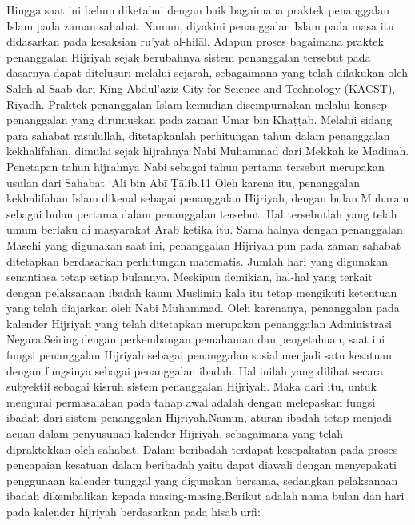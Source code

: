     Hingga saat ini belum diketahui dengan baik bagaimana praktek penanggalan Islam pada zaman sahabat. Namun, diyakini penanggalan Islam pada masa itu didasarkan pada kesaksian ru’yat al-hilāl. Adapun proses bagaimana praktek penanggalan Hijriyah sejak berubahnya sistem penanggalan tersebut pada dasarnya dapat ditelusuri melalui sejarah, sebagaimana yang telah dilakukan oleh Saleh al-Saab dari King Abdul’aziz City for Science and Technology (KACST), Riyadh.
    Praktek penanggalan Islam kemudian disempurnakan melalui konsep penanggalan yang dirumuskan pada zaman Umar bin Khaṭṭab. Melalui sidang para sahabat rasulullah, ditetapkanlah perhitungan tahun dalam penanggalan kekhalifahan, dimulai sejak hijrahnya Nabi Muhammad dari Mekkah ke Madinah.
    Penetapan tahun hijrahnya Nabi sebagai tahun pertama tersebut merupakan usulan dari Sahabat ‘Ali bin Abī Ṭālib.11 Oleh karena itu, penanggalan kekhalifahan Islam dikenal sebagai penanggalan Hijriyah, dengan bulan Muharam sebagai bulan pertama dalam penanggalan tersebut. Hal tersebutlah yang telah umum berlaku di masyarakat Arab ketika itu.
    Sama halnya dengan penanggalan Masehi yang digunakan saat ini, penanggalan Hijriyah pun pada zaman sahabat ditetapkan berdasarkan perhitungan matematis. Jumlah hari yang digunakan senantiasa tetap setiap bulannya. Meskipun demikian, hal-hal yang terkait dengan pelaksanaan ibadah kaum Muslimin kala itu tetap mengikuti ketentuan yang telah diajarkan oleh Nabi Muhammad.
    Oleh karenanya, penanggalan pada kalender Hijriyah yang telah ditetapkan merupakan penanggalan Administrasi Negara.Seiring dengan perkembangan pemahaman dan pengetahuan, saat ini fungsi penanggalan Hijriyah sebagai penanggalan sosial menjadi satu kesatuan dengan fungsinya sebagai penanggalan ibadah. Hal inilah yang dilihat secara subyektif sebagai kisruh sistem penanggalan Hijriyah.
    Maka dari itu, untuk mengurai permasalahan pada tahap awal adalah dengan melepaskan fungsi ibadah dari sistem penanggalan Hijriyah.Namun, aturan ibadah tetap menjadi acuan dalam penyusunan kalender Hijriyah, sebagaimana yang telah dipraktekkan oleh sahabat. Dalam beribadah terdapat kesepakatan pada proses pencapaian kesatuan dalam beribadah yaitu dapat diawali dengan menyepakati penggunaan kalender tunggal yang digunakan bersama, sedangkan pelaksanaan ibadah dikembalikan kepada masing-masing.Berikut adalah nama bulan dan hari pada kalender hijriyah berdasarkan pada hisab urfi:
